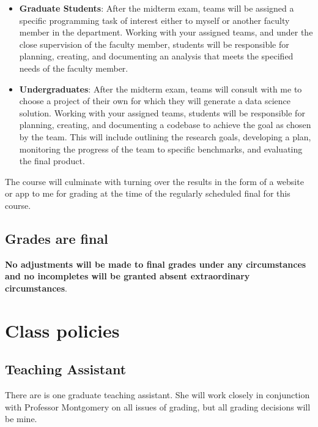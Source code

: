 \documentclass[11pt]{article}
\begin{document}
\begin{itemize}
\item \textbf{Graduate Students}: After the midterm exam, teams will be
  assigned a specific programming task of interest either to myself or
  another faculty member in the department.  Working with your
  assigned teams, and under the close supervision of the faculty
  member, students will be responsible for planning, creating, and
  documenting an analysis  that meets the specified needs of the
  faculty member.  
\item \textbf{Undergraduates}: After the midterm exam, teams will
  consult with me to choose a project of their own for which they will
  generate a data science solution.  Working with your assigned teams,
  students will be responsible for planning, creating, and documenting
  a codebase to achieve the goal as chosen by the team.  This will
  include outlining the research goals, developing a plan, monitoring
  the progress of the team to specific benchmarks, and evaluating the
  final product.  
\end{itemize}

\noindent The course will culminate with turning over the results in
the form of a website or app to me for grading at the time of the
regularly scheduled final for this course.

\subsection*{Grades are final}

\textbf{No adjustments will be made to final grades under any circumstances
and no incompletes will be granted absent extraordinary
circumstances}.  

\section*{Class policies}

\subsection*{Teaching Assistant}

There are is one graduate teaching assistant. She will work closely in
conjunction with Professor Montgomery on all issues of grading, but
all grading decisions will be mine.  
\vspace{.2cm}
\end{document}
